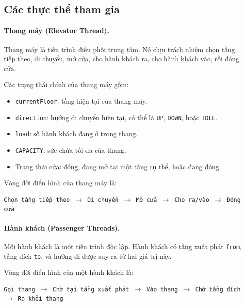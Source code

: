 \subsection{Các thực thể tham gia}

\paragraph{Thang máy (Elevator Thread).}

Thang máy là tiến trình điều phối trung tâm. Nó chịu trách nhiệm chọn tầng
tiếp theo, di chuyển, mở cửa, cho hành khách ra, cho hành khách vào, rồi
đóng cửa.

Các trạng thái chính của thang máy gồm:

\begin{itemize}
    \item \texttt{currentFloor}: tầng hiện tại của thang máy.
    \item \texttt{direction}: hướng di chuyển hiện tại, có thể là
    \texttt{UP}, \texttt{DOWN}, hoặc \texttt{IDLE}.
    \item \texttt{load}: số hành khách đang ở trong thang.
    \item \texttt{CAPACITY}: sức chứa tối đa của thang.
    \item Trạng thái cửa: đóng, đang mở tại một tầng cụ thể, hoặc đang đóng.
\end{itemize}

Vòng đời điển hình của thang máy là:

\begin{center}
\texttt{Chọn tầng tiếp theo $\rightarrow$ Di chuyển $\rightarrow$ Mở cửa
$\rightarrow$ Cho ra/vào $\rightarrow$ Đóng cửa}
\end{center}

\paragraph{Hành khách (Passenger Threads).}

Mỗi hành khách là một tiến trình độc lập. Hành khách có tầng xuất phát
\texttt{from}, tầng đích \texttt{to}, và hướng đi được suy ra từ hai giá
trị này.

Vòng đời điển hình của một hành khách là:

\begin{center}
\texttt{Gọi thang $\rightarrow$ Chờ tại tầng xuất phát $\rightarrow$ Vào thang
$\rightarrow$ Chờ tầng đích $\rightarrow$ Ra khỏi thang}
\end{center}


